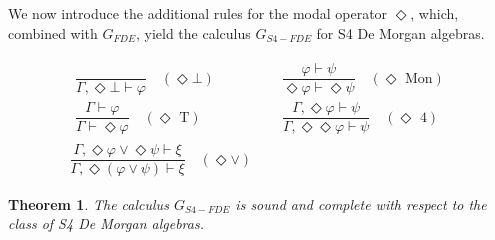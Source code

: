 \documentclass{amsart}
\theoremstyle{plain}
\newtheorem{theorem}{Theorem}[section]
\theoremstyle{definition}
\begin{document}
We now introduce the additional rules for the modal operator $\Diamond$, which, combined with $G_{FDE}$, yield the calculus $G_{S4-FDE}$ for S4 De Morgan algebras.

\begin{table}[htbp]
\centering
\label{t:GS4-FDE}
\begin{gather*}
\begin{aligned}
\dfrac{}{\Gamma,\Diamond \bot \vdash \varphi} \quad (\Diamond \bot)
&\qquad\qquad
\dfrac{\varphi \vdash \psi}{\Diamond \varphi \vdash \Diamond \psi} \quad (\Diamond\text{ Mon}) 
\\[1em]
\dfrac{\Gamma \vdash \varphi}{\Gamma \vdash \Diamond\varphi} \quad (\Diamond \text{ T})
&\qquad\qquad
\dfrac{\Gamma, \Diamond\varphi \vdash \psi}{\Gamma, \Diamond\Diamond\varphi \vdash \psi} \quad (\Diamond \text{ 4})
\end{aligned}
\\[1.5em]
\dfrac{\Gamma, \Diamond\varphi \lor \Diamond\psi \vdash \xi}{\Gamma, \Diamond(\varphi \lor \psi) \vdash \xi} \quad (\Diamond \lor)
\end{gather*}
\caption{The additional rules for $\Diamond$ of the sequent calculus $G_{S4-FDE}$}
\end{table}
\begin{theorem}\label{algebraic completeness}
    The calculus $G_{S4-FDE}$ is sound and complete with respect to the class of S4 De Morgan algebras.
\end{theorem}
\end{document}
